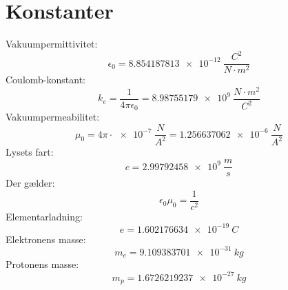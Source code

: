 \documentclass[]{article}
\theoremstyle{definition}
\begin{document}
\section{Konstanter}
Vakuumpermittivitet:
\begin{equation*}
	\epsilon_0 = \SI{8.854187813e-12}{\dfrac{C^2}{N \cdot m^2}}
\end{equation*}
Coulomb-konstant:
\begin{equation*}
	k_e = \frac{1}{4\pi \epsilon_0} = \SI{8.98755179e9}{\dfrac{N \cdot m^2}{C^2}}
\end{equation*}
Vakuumpermeabilitet:
\begin{equation*}
	\mu_0 = 4\pi \cdot \SI{e-7}{\frac{N}{A^2}} = \SI{1.256637062e-6}{\frac{N}{A^2}}
\end{equation*}
Lysets fart:
\begin{equation*}
	c = \SI{2.99 792 458e9}{\frac{m}{s}}
\end{equation*}
Der gælder:
\begin{equation*}
	\epsilon_0 \mu_0 = \dfrac{1}{c^2}
\end{equation*}
Elementarladning:
\begin{equation*}
	e = \SI{1.602176634e-19}{C}
\end{equation*}
Elektronens masse:
\begin{equation*}
	m_e = \SI{9.109383701e-31}{kg}
\end{equation*}
Protonens masse:
\begin{equation*}
	m_p = \SI{1.6726219237e-27}{kg}
\end{equation*}
\end{document}
